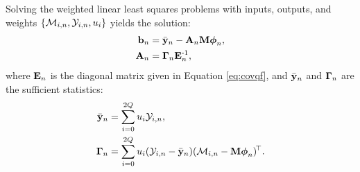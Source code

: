  Solving the weighted linear least squares problems with inputs, outputs, and weights 
$\{ \mathcal{M}_{i,n},  \mathcal{Y}_{i,n}, u_{i} \}$ yields the solution:
\newcommand{\ybar}{\bar\outs_n}
\newcommand{ \Cross}{\mat{\Gamma}_n}
\begin{align}
	 \intcpt_n & = \ybar - \Linmat_n \pWeights \feats_n \text{,} \\
	\Linmat_n &= \Cross \covfn\inv \text{,}
\end{align}
where  $\mathbf{E}_n$ is the diagonal matrix given in Equation \eqref{eq:covqf}, and 
 $\ybar$ and $\Cross$ are the sufficient statistics:
\begin{align}
\ybar  &=  \sum_{i=0}^{2 \ltdim} \Sw_{i} \Sobs_{i,n} \text{,} \\
 \Cross &= \sum_{i=0}^{2\ltdim} \Sw_{i} (\Sobs_{i,n} - \ybar) (\Sfunc_{i,n} - \pWeights \feats_n)\transpose \text{.}
\end{align}







































